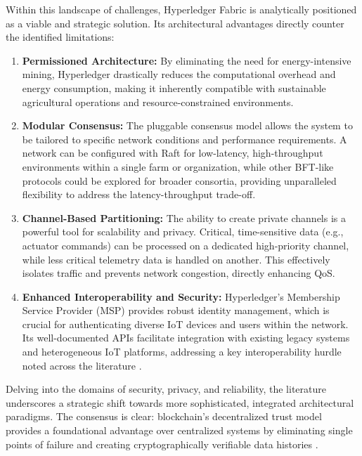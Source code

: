 \documentclass[12pt,onecolumn]{IEEEtran} %
\begin{document}
Within this landscape of challenges, Hyperledger Fabric is analytically positioned as a viable and strategic solution. Its architectural advantages directly counter the identified limitations:
\begin{enumerate}
    \item \textbf{Permissioned Architecture:} By eliminating the need for energy-intensive mining, Hyperledger drastically reduces the computational overhead and energy consumption, making it inherently compatible with sustainable agricultural operations and resource-constrained environments.
    \item \textbf{Modular Consensus:} The pluggable consensus model allows the system to be tailored to specific network conditions and performance requirements. A network can be configured with Raft for low-latency, high-throughput environments within a single farm or organization, while other BFT-like protocols could be explored for broader consortia, providing unparalleled flexibility to address the latency-throughput trade-off.
    \item \textbf{Channel-Based Partitioning:} The ability to create private channels is a powerful tool for scalability and privacy. Critical, time-sensitive data (e.g., actuator commands) can be processed on a dedicated high-priority channel, while less critical telemetry data is handled on another. This effectively isolates traffic and prevents network congestion, directly enhancing QoS.
    \item \textbf{Enhanced Interoperability and Security:} Hyperledger's Membership Service Provider (MSP) provides robust identity management, which is crucial for authenticating diverse IoT devices and users within the network. Its well-documented APIs facilitate integration with existing legacy systems and heterogeneous IoT platforms, addressing a key interoperability hurdle noted across the literature \cite{aliyu2023blockchainbasedsmartfarm, tang2024assessingblockchainand}.
\end{enumerate}

Delving into the domains of security, privacy, and reliability, the literature underscores a strategic shift towards more sophisticated, integrated architectural paradigms. The consensus is clear: blockchain's decentralized trust model provides a foundational advantage over centralized systems by eliminating single points of failure and creating cryptographically verifiable data histories \cite{aliyu2023blockchainbasedsmartfarm, soy2025blockchainintegrationin}.
\end{document}
